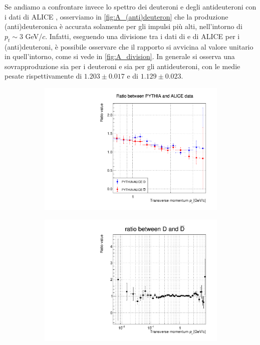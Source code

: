 Se andiamo a confrontare invece lo spettro dei deuteroni e degli antideuteroni con i dati di ALICE \cite{ALICE:2020foi}, osserviamo in \autoref{fig:A_(anti)deuteron} che la produzione (anti)deuteronica è accurata solamente per gli impulsi più alti, nell'intorno di $p_t \sim 3$ GeV/$c$.
Infatti, eseguendo una divisione tra i dati di \pythia e di ALICE per i (anti)deuteroni, è possibile osservare che il rapporto si avvicina al valore unitario in quell'intorno, come si vede in \autoref{fig:A_division}.
In generale si osserva una sovrapproduzione sia per i deuteroni e sia per gli antideuteroni, con le medie pesate rispettivamente di $1.203 \pm 0.017$ e di $1.129 \pm 0.023$.
\begin{figure}[htb]
    \centering
    \begin{subfigure}{.49\textwidth}
    \centering
        \includegraphics[width=\textwidth]{image/3-risultati/analyse/A/division.pdf}
        \caption{}
        \label{fig:A_division}
    \end{subfigure}
    \begin{subfigure}{.49\textwidth}
        \centering
        \includegraphics[width=\textwidth]{image/3-risultati/analyse/A/ratio_DD.pdf}

\end{subfigure}
\end{figure}
